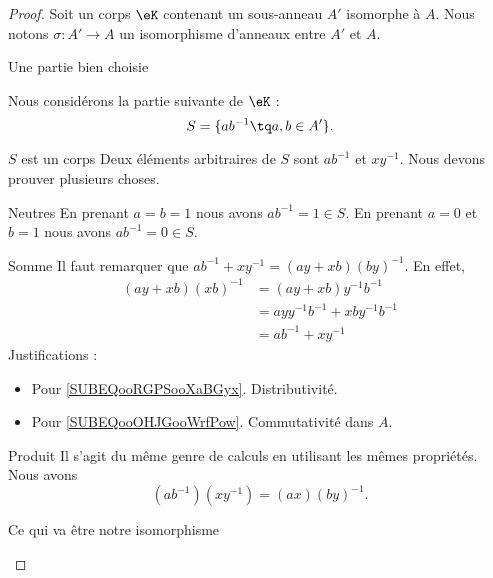 \begin{proof}
    Soit un corps \( \eK\) contenant un sous-anneau \( A'\) isomorphe à \( A\). Nous notons \( \sigma\colon A'\to A\) un isomorphisme d'anneaux entre \( A'\) et \( A\). 

    \begin{subproof}
    \item[Une partie bien choisie]

    Nous considérons la partie suivante de \( \eK\) :
    \begin{equation}
        S=\{ ab^{-1}\tq a,b\in A' \}.
    \end{equation}

\item[\( S\) est un corps]
Deux éléments arbitraires de \( S\) sont \( ab^{-1}\) et \( xy^{-1}\). Nous devons prouver plusieurs choses.
\begin{subproof}
\item[Neutres]
    En prenant \( a=b=1\) nous avons \( ab^{-1}=1\in S\). En prenant \( a=0\) et \( b=1\) nous avons \( ab^{-1}=0\in S\).
\item[Somme]
    Il faut remarquer que \( ab^{-1}+xy^{-1}=(ay+xb)(by)^{-1}\). En effet,
    \begin{subequations}
        \begin{align}
            (ay+xb)(xb)^{-1}&=(ay+xb)y^{-1}b^{-1}\\
            &=ayy^{-1}b^{-1}+xby^{-1}b^{-1}     \label{SUBEQooRGPSooXaBGyx}\\
            &=ab^{-1}+xy^{-1}       \label{SUBEQooOHJGooWrfPow}
        \end{align}
    \end{subequations}
    Justifications :
    \begin{itemize}
        \item Pour \eqref{SUBEQooRGPSooXaBGyx}. Distributivité.
        \item Pour \eqref{SUBEQooOHJGooWrfPow}. Commutativité dans \( A\).
    \end{itemize}
\item[Produit]
    Il s'agit du même genre de calculs en utilisant les mêmes propriétés. Nous avons
    \begin{equation}
        (ab^{-1})(xy^{-1})=(ax)(by)^{-1}.
    \end{equation}
\end{subproof}

\item[Ce qui va être notre isomorphisme]



\end{subproof}
\end{proof}
